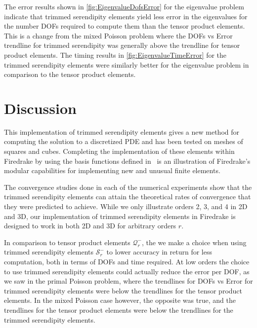 \documentclass[format=acmsmall,screen,timestamp=false,a4paper]{acmart}
\newcommand{\calQ}{\mathcal{Q}}
\newcommand{\calS}{\mathcal{S}}
\begin{document}
The error results shown in \cref{fig:EigenvalueDofsError} for the eigenvalue problem indicate that trimmed serendipity elements yield less error in the eigenvalues for the number DOFs required to compute them than the tensor product elements.  This is a change from the mixed Poisson problem where the DOFs vs Error trendline for trimmed serendipity was generally above the trendline for tensor product elements.  %
The timing results in \ref{fig:EigenvalueTimeError} for the trimmed serendipity elements were similarly better for the eigenvalue problem in comparison to the tensor product elements.


\section{Discussion}

This implementation of trimmed serendipity elements gives a new method for computing the solution to a discretized PDE and has been tested on meshes of squares and cubes.  Completing the implementation of these elements within Firedrake by using the basis functions defined in~\cite{gillette2019computational} is an illustration of Firedrake's modular capabilities for implementing new and unusual finite elements. 

The convergence studies done in each of the numerical experiments show that the trimmed serendipity elements can attain the theoretical rates of convergence that they were predicted to achieve.  While we only illustrate orders 2, 3, and 4 in 2D and 3D, our implementation of trimmed serendipity elements in Firedrake is designed to work in both 2D and 3D for arbitrary orders $r$.  

In comparison to tensor product elements $\mathcal{Q}^-_r$, the we make a choice when using trimmed serendipity elements $\mathcal{S}^-_r$ to lower accuracy in return for less computation, both in terms of DOFs and time required.  At low orders the choice to use trimmed serendipity elements could actually reduce the error per DOF, as we saw in the primal Poisson problem, where the trendlines for DOFs vs Error for trimmed serendipity elements were below the trendlines for the tensor product elements.  In the mixed Poisson case however, the opposite was true, and the trendlines for the tensor product elements were below the trendlines for the trimmed serendipity elements.
\end{document}
